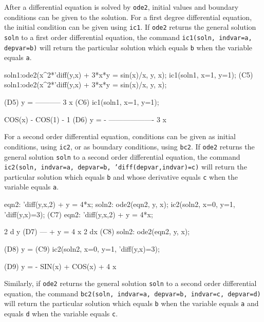 \documentclass{article}
\begin{document}
After a differential equation is solved by \texttt{ode2}, initial
values and boundary conditions can be given to the solution.  For a
first degree differential equation, the initial condition can be given
using \texttt{ic1}. If \texttt{ode2} returns the general solution
\texttt{soln} to a first order differential equation, the command
\texttt{ic1(soln, indvar=a, depvar=b)} will return the particular
solution which equals \texttt{b} when the variable equals \texttt{a}.

\beginmaximasession
soln1:ode2(x^2*'diff(y,x) + 3*x*y = sin(x)/x, y, x);
ic1(soln1, x=1, y=1);
\maximasession
(C5) soln1:ode2(x^2*'diff(y,x) + 3*x*y = sin(x)/x, y, x);


(D5)                            y = -----------
                                         3
                                        x
(C6) ic1(soln1, x=1, y=1);


                                 COS(x) - COS(1) - 1
(D6)                       y = - -------------------
                                          3
                                         x
\endmaximasession

For a second order differential equation, conditions can be given as
initial conditions, using \texttt{ic2}, or as boundary conditions,
using \texttt{bc2}.  If \texttt{ode2} returns the general solution
\texttt{soln} to a second order differential equation, the command
\texttt{ic2(soln, indvar=a, depvar=b, 'diff(depvar,indvar)=c)} will
return the particular solution which equals \texttt{b} and whose
derivative equals \texttt{c} when the variable equals \texttt{a}.

\beginmaximasession
eqn2: 'diff(y,x,2) + y = 4*x;
soln2: ode2(eqn2, y, x);
ic2(soln2, x=0, y=1, 'diff(y,x)=3);
\maximasession
(C7) eqn2: 'diff(y,x,2) + y = 4*x;


                                  2
                                 d y
(D7)                             --- + y = 4 x
                                   2
                                 dx
(C8) soln2: ode2(eqn2, y, x);


(D8)                   y = %
(C9) ic2(soln2, x=0, y=1, 'diff(y,x)=3);


(D9)                      y = - SIN(x) + COS(x) + 4 x
\endmaximasession

Similarly, if \texttt{ode2} returns the general solution \texttt{soln}
to a second order differential equation, the command \texttt{bc2(soln,
  indvar=a, depvar=b, indvar=c, depvar=d)} will return the particular
solution which equals \texttt{b} when the variable equals \texttt{a}
and equals \texttt{d} when the variable equals \texttt{c}.
\end{document}

